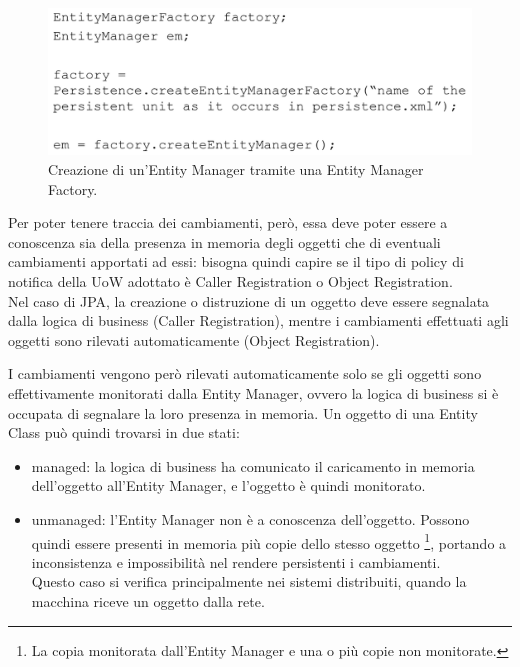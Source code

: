 \begin{figure}[h]
    \centering
    \includegraphics[width=1\linewidth]{img/entity_manager_factory.png}
    \caption{Creazione di un'Entity Manager tramite una Entity Manager Factory.}
    \label{fig:ent_man_factory}
\end{figure}

Per poter tenere traccia dei cambiamenti, però, essa deve poter essere a conoscenza sia della presenza in memoria degli oggetti che di eventuali cambiamenti apportati ad essi: bisogna quindi capire se il tipo di policy di notifica della UoW adottato è Caller Registration o Object Registration.\\
Nel caso di JPA, la creazione o distruzione di un oggetto deve essere segnalata dalla logica di business (Caller Registration), mentre i cambiamenti effettuati agli oggetti sono rilevati automaticamente (Object Registration).

I cambiamenti vengono però rilevati automaticamente solo se gli oggetti sono effettivamente monitorati dalla Entity Manager, ovvero la logica di business si è occupata di segnalare la loro presenza in memoria.
Un oggetto di una Entity Class può quindi trovarsi in due stati:
\begin{itemize}
    \item managed: la logica di business ha comunicato il caricamento in memoria dell'oggetto all'Entity Manager, e l'oggetto è quindi monitorato.
    \item unmanaged: l'Entity Manager non è a conoscenza dell'oggetto. Possono quindi essere presenti in memoria più copie dello stesso oggetto \footnote{La copia monitorata dall'Entity Manager e una o più copie non monitorate.}, portando a inconsistenza e impossibilità nel rendere persistenti i cambiamenti.\\
    Questo caso si verifica principalmente nei sistemi distribuiti, quando la macchina riceve un oggetto dalla rete.
\end{itemize}

